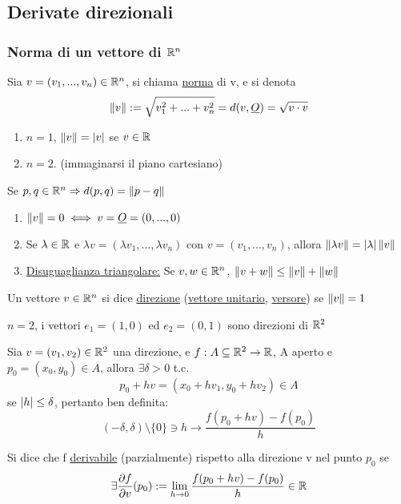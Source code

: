 \subsection{Derivate direzionali}
\subsubsection{Norma di un vettore di $\mathbb{R}^n$}
Sia $v = (v_1,...,v_n)\in\mathbb{R}^n$, si chiama \underline{norma} di v, e si denota 
$$\left\lVert v\right\rVert := \sqrt{v_1^2+...+v_n^2} = d(v,\underline{O}) = \sqrt{v\cdot v}$$
\begin{example}
  \begin{enumerate}
    \item $n = 1$, $\left\lVert v\right\rVert = \left\lvert v \right\rvert$ se $v\in \mathbb{R}$
    \item $n = 2$. (immaginarsi il piano cartesiano)
  \end{enumerate}
\end{example}
\begin{osservazione}
  Se $p,q \in \mathbb{R}^n \Rightarrow d(p,q) = \left\lVert p-q\right\rVert$
\end{osservazione}
\begin{exercise}[6,foglio 1]
  \begin{enumerate}
    \item $\left\lVert v\right\rVert = 0 \iff v = \underline{O} = (0,...,0)$
    \item Se $\lambda \in \mathbb{R}$ e $\lambda v = (\lambda v_1, ..., \lambda v_n)$ con $v = (v_1,...,v_n)$, 
          allora $\left\lVert\lambda v\right\rVert = \left\lvert \lambda \right\rvert\left\lVert v\right\rVert$
    \item \underline{Disuguaglianza triangolare:} Se $v,w \in \mathbb{R}^n$, $\left\lVert v+w\right\rVert \leq \left\lVert v\right\rVert + \left\lVert w\right\rVert$
  \end{enumerate}
\end{exercise}
\begin{definition}
  Un vettore $v \in \mathbb{R}^n$ si dice \underline{direzione} (\underline{vettore unitario}, \underline{versore}) se $\left\lVert v\right\rVert = 1$
\end{definition}
\begin{example}
  $n=2$, i vettori $e_1 = (1,0)$ ed $e_2= (0,1)$ sono direzioni di $\mathbb{R}^2$
\end{example}
Sia $v = (v_1,v_2)\in \mathbb{R}^2$ una direzione, e $f: A \subseteq \mathbb{R}^2 \to \mathbb{R}$, A aperto e $p_0 = (x_0,y_0)\in A$, allora 
$\exists \delta > 0$ t.c. $$p_0+hv = (x_0+hv_1,y_0+hv_2)\in A$$
se $\left\lvert h \right\rvert\leq \delta$, pertanto \ace ben definita: 
$$ (-\delta, \delta) \setminus \{0\} \ni h \rightarrow \frac{f(p_0+hv) -f(p_0)}{h}$$
\begin{definition}
  Si dice che f \ace \underline{derivabile} (parzialmente) rispetto alla direzione v nel punto $p_0$
  se $$\exists \frac{\partial f}{\partial v} (p_0) := \lim_{h\to 0} \frac{f(p_0+hv) -f(p_0)}{h} \in \mathbb{R}$$
\end{definition}
